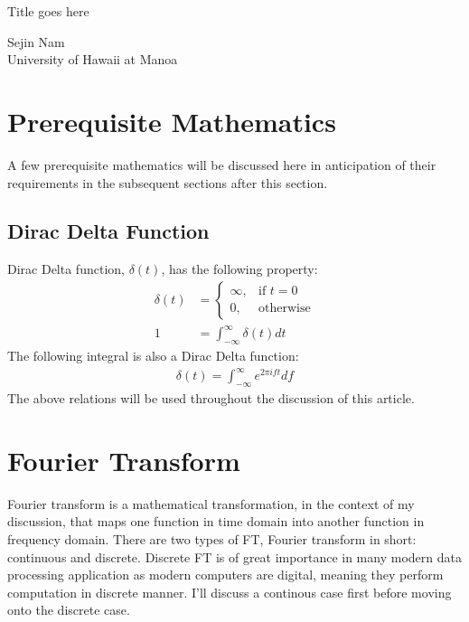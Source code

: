 \documentclass[letterpaper, 11pt]{article}
\newcommand{\fint}{\int_{-\infty}^{\infty}}
\numberwithin{equation}{section}
\begin{document}
\begin{titlepage}
	\begin{center}
		\Huge Title goes here \vfill 
	\end{center}

	\begin{flushright}
		Sejin Nam\\
		University of Hawaii at Manoa
	\end{flushright}
\end{titlepage}

\tableofcontents
\clearpage

\section{Prerequisite Mathematics}
A few prerequisite mathematics will be discussed here in anticipation of their requirements in the subsequent sections after this section. 

\subsection{Dirac Delta Function}
Dirac Delta function, \(\delta (t)\), has the following property:
\begin{align}
	\delta (t)	&=\begin{cases}
		\infty, & \text{if } t = 0 \\
		0,	& \text{otherwise}
	\end{cases}\\
		1	&= \fint \delta (t) dt
\end{align}
The following integral is also a Dirac Delta function:
\begin{align}
	\delta (t) = \fint e^{2\pi ift} df\label{eq:1}
\end{align}
The above relations will be used throughout the discussion of this article.

\section{Fourier Transform}
Fourier transform is a mathematical transformation, in the context of my discussion, that maps one function in time domain into another function in frequency domain. There are two types of FT, Fourier transform in short: continuous and discrete. Discrete FT is of great importance in many modern data processing application as modern computers are digital, meaning they perform computation in discrete manner. I'll discuss a continous case first before moving onto the discrete case.
\end{document}
